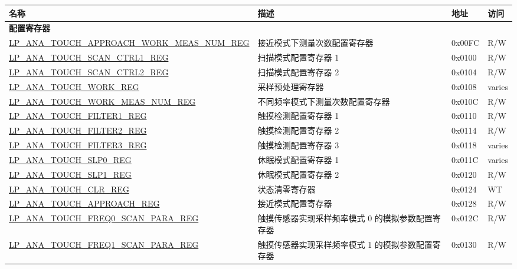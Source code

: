 \begin{longtable}{ | l| p{10cm} | p{1.3cm} | p{1cm} | }
\hline\rowcolor{lightgray}
\textbf{名称} & \textbf{描述} & \textbf{地址} & \textbf{访问} \\ \hline
\endhead
\multicolumn{4}{|l|}{\textbf{配置寄存器}} \\ \hline
\hyperref[regdesc:LPANATOUCHAPPROACHWORKMEASNUMREG]{LP\_ANA\_TOUCH\_APPROACH\_WORK\_MEAS\_NUM\_REG} & 接近模式下测量次数配置寄存器 & 0x00FC & R/W \\ \hline
\hyperref[regdesc:LPANATOUCHSCANCTRL1REG]{LP\_ANA\_TOUCH\_SCAN\_CTRL1\_REG} & 扫描模式配置寄存器 1 & 0x0100 & R/W \\ \hline
\hyperref[regdesc:LPANATOUCHSCANCTRL2REG]{LP\_ANA\_TOUCH\_SCAN\_CTRL2\_REG} & 扫描模式配置寄存器 2 & 0x0104 & R/W \\ \hline
\hyperref[regdesc:LPANATOUCHWORKREG]{LP\_ANA\_TOUCH\_WORK\_REG} & 采样预处理寄存器 & 0x0108 & varies \\ \hline
\hyperref[regdesc:LPANATOUCHWORKMEASNUMREG]{LP\_ANA\_TOUCH\_WORK\_MEAS\_NUM\_REG} & 不同频率模式下测量次数配置寄存器 & 0x010C & R/W \\ \hline
\hyperref[regdesc:LPANATOUCHFILTER1REG]{LP\_ANA\_TOUCH\_FILTER1\_REG} & 触摸检测配置寄存器 1 & 0x0110 & R/W \\ \hline
\hyperref[regdesc:LPANATOUCHFILTER2REG]{LP\_ANA\_TOUCH\_FILTER2\_REG} & 触摸检测配置寄存器 2 & 0x0114 & R/W \\ \hline
\hyperref[regdesc:LPANATOUCHFILTER3REG]{LP\_ANA\_TOUCH\_FILTER3\_REG} & 触摸检测配置寄存器 3 & 0x0118 & varies \\ \hline
\hyperref[regdesc:LPANATOUCHSLP0REG]{LP\_ANA\_TOUCH\_SLP0\_REG} & 休眠模式配置寄存器 1 & 0x011C & varies \\ \hline
\hyperref[regdesc:LPANATOUCHSLP1REG]{LP\_ANA\_TOUCH\_SLP1\_REG} & 休眠模式配置寄存器 2 & 0x0120 & R/W \\ \hline
\hyperref[regdesc:LPANATOUCHCLRREG]{LP\_ANA\_TOUCH\_CLR\_REG} & 状态清零寄存器 & 0x0124 & WT \\ \hline
\hyperref[regdesc:LPANATOUCHAPPROACHREG]{LP\_ANA\_TOUCH\_APPROACH\_REG} & 接近模式配置寄存器 & 0x0128 & R/W \\ \hline
\hyperref[regdesc:LPANATOUCHFREQ0SCANPARAREG]{LP\_ANA\_TOUCH\_FREQ0\_SCAN\_PARA\_REG} & 触摸传感器实现采样频率模式 0 的模拟参数配置寄存器 & 0x012C & R/W \\ \hline
\hyperref[regdesc:LPANATOUCHFREQ0SCANPARAREG]{LP\_ANA\_TOUCH\_FREQ1\_SCAN\_PARA\_REG} & 触摸传感器实现采样频率模式 1 的模拟参数配置寄存器 & 0x0130 & R/W \\ \hline

\end{longtable}
